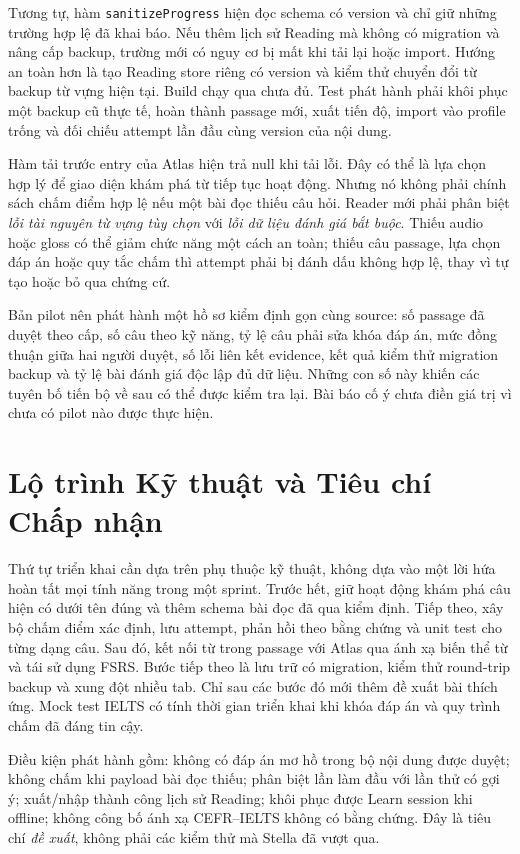 \documentclass[conference,10pt]{IEEEtran}
\begin{document}
Tương tự, hàm \texttt{sanitizeProgress} hiện đọc schema có version và chỉ giữ những trường hợp lệ đã khai báo. Nếu thêm lịch sử Reading mà không có migration và nâng cấp backup, trường mới có nguy cơ bị mất khi tải lại hoặc import. Hướng an toàn hơn là tạo Reading store riêng có version và kiểm thử chuyển đổi từ backup từ vựng hiện tại. Build chạy qua chưa đủ. Test phát hành phải khôi phục một backup cũ thực tế, hoàn thành passage mới, xuất tiến độ, import vào profile trống và đối chiếu attempt lần đầu cùng version của nội dung.

Hàm tải trước entry của Atlas hiện trả null khi tải lỗi. Đây có thể là lựa chọn hợp lý để giao diện khám phá từ tiếp tục hoạt động. Nhưng nó không phải chính sách chấm điểm hợp lệ nếu một bài đọc thiếu câu hỏi. Reader mới phải phân biệt \emph{lỗi tài nguyên từ vựng tùy chọn} với \emph{lỗi dữ liệu đánh giá bắt buộc}. Thiếu audio hoặc gloss có thể giảm chức năng một cách an toàn; thiếu câu passage, lựa chọn đáp án hoặc quy tắc chấm thì attempt phải bị đánh dấu không hợp lệ, thay vì tự tạo hoặc bỏ qua chứng cứ.

Bản pilot nên phát hành một hồ sơ kiểm định gọn cùng source: số passage đã duyệt theo cấp, số câu theo kỹ năng, tỷ lệ câu phải sửa khóa đáp án, mức đồng thuận giữa hai người duyệt, số lỗi liên kết evidence, kết quả kiểm thử migration backup và tỷ lệ bài đánh giá độc lập đủ dữ liệu. Những con số này khiến các tuyên bố tiến bộ về sau có thể được kiểm tra lại. Bài báo cố ý chưa điền giá trị vì chưa có pilot nào được thực hiện.

\section{Lộ trình Kỹ thuật và Tiêu chí Chấp nhận}
Thứ tự triển khai cần dựa trên phụ thuộc kỹ thuật, không dựa vào một lời hứa hoàn tất mọi tính năng trong một sprint. Trước hết, giữ hoạt động khám phá câu hiện có dưới tên đúng và thêm schema bài đọc đã qua kiểm định. Tiếp theo, xây bộ chấm điểm xác định, lưu attempt, phản hồi theo bằng chứng và unit test cho từng dạng câu. Sau đó, kết nối từ trong passage với Atlas qua ánh xạ biến thể từ và tái sử dụng FSRS. Bước tiếp theo là lưu trữ có migration, kiểm thử round-trip backup và xung đột nhiều tab. Chỉ sau các bước đó mới thêm đề xuất bài thích ứng. Mock test IELTS có tính thời gian triển khai khi khóa đáp án và quy trình chấm đã đáng tin cậy.

Điều kiện phát hành gồm: không có đáp án mơ hồ trong bộ nội dung được duyệt; không chấm khi payload bài đọc thiếu; phân biệt lần làm đầu với lần thử có gợi ý; xuất/nhập thành công lịch sử Reading; khôi phục được Learn session khi offline; không công bố ánh xạ CEFR--IELTS không có bằng chứng. Đây là tiêu chí \emph{đề xuất}, không phải các kiểm thử mà Stella đã vượt qua.
\end{document}
